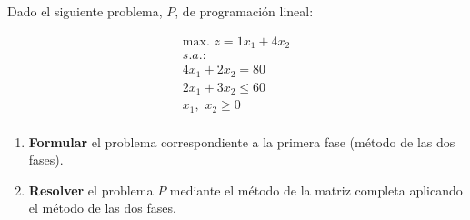 Dado el siguiente problema, $P$, de programación lineal:

\begin{equation}
\begin{split}
\label{eq:dos_fases_a}
\mbox{max. } z = 1x_1 + 4x_2\\
s.a.:\\
4x_1 + 2x_2 = 80\\
2x_1 + 3x_2 \leq 60\\
x_1,\,\,x_2\geq 0\\
\end{split}
\end{equation}

\begin{enumerate}
    \item \textbf{Formular} el problema correspondiente a la primera fase (método de las dos fases).
    \item \textbf{Resolver} el problema $P$ mediante el método de la matriz completa aplicando el método de las dos fases.
\end{enumerate}
